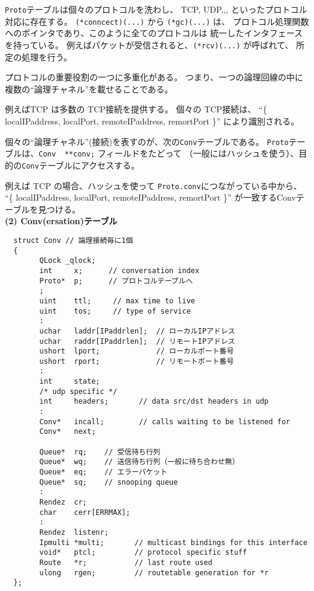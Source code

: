 {\tt Proto}テーブルは個々のプロトコルを洗わし、
 TCP, UDP,,, といったプロトコル対応に存在する。
\verb|(*conncect)(...)| から \verb|(*gc)(...)| は、
プロトコル処理関数へのポインタであり、このように全てのプロトコルは
統一したインタフェースを持っている。
例えばパケットが受信されると、\verb|(*rcv)(...)| が呼ばれて、
所定の処理を行う。

プロトコルの重要役割の一つに多重化がある。
つまり、一つの論理回線の中に複数の``論理チャネル''を載せることである。

例えばTCP は多数の TCP接続を提供する。
個々の TCP接続は、
 ``\{ localIPaddress, localPort, remoteIPaddress, remortPort \}'' 
により識別される。

個々の``論理チャネル''(接続)を表すのが、次の{\tt Conv}テーブルである。
{\tt Proto}テーブルは、\verb|Conv  **conv;| フィールドをたどって
（一般にはハッシュを使う）、目的の{\tt Conv}テーブルにアクセスする。

例えば TCP の場合、ハッシュを使って 
\verb|Proto.conv|につながっている中から、
 ``\{ localIPaddress, localPort, remoteIPaddress, remortPort \}''
が一致するConvテーブルを見つける。
\\


{\bf \flushleft(2) Conv(ersation)テーブル}

{\footnotesize
\begin{verbatim}
  struct Conv // 論理接続毎に1個
  {
        QLock _qlock;   
        int     x;      // conversation index 
        Proto*  p;      // プロトコルテーブルへ
        ;
        uint    ttl;     // max time to live 
        uint    tos;     // type of service 
        :
        uchar   laddr[IPaddrlen];  // ローカルIPアドレス
        uchar   raddr[IPaddrlen];  // リモートIPアドレス
        ushort  lport;             // ローカルポート番号
        ushort  rport;             // リモートポート番号
        :
        int     state;
        /* udp specific */
        int     headers;       // data src/dst headers in udp 
        :
        Conv*   incall;        // calls waiting to be listened for 
        Conv*   next;

        Queue*  rq;    // 受信待ち行列
        Queue*  wq;    // 送信待ち行列（一般に待ち合わせ無）
        Queue*  eq;    // エラーパケット
        Queue*  sq;    // snooping queue 
        :
        Rendez  cr;
        char    cerr[ERRMAX];
        :
        Rendez  listenr;
        Ipmulti *multi;       // multicast bindings for this interface 
        void*   ptcl;         // protocol specific stuff 
        Route   *r;           // last route used 
        ulong   rgen;         // routetable generation for *r 
  };
\end{verbatim}
}

